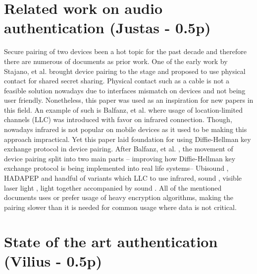\documentclass[12pt]{article}
\begin{document}
\newpage

\section{Related work on audio authentication (Justas - 0.5p)}
\label{sec:Related work on audio authentication}
Secure pairing of two devices been a hot topic for the past decade and therefore there are numerous of documents as prior work. One of the early work by  Stajano, et al. \cite {pairingintro} brought device pairing to the stage and proposed to use physical contact for shared secret sharing. Physical contact such as a cable is not a feasible solution nowadays due to interfaces mismatch on devices and not being user friendly. Nonetheless, this paper was used as an inspiration for new papers in this field. An example of such is Balfanz, et al. \cite {talkingto} where usage of location-limited channels (LLC) was introduced with favor on infrared connection. Though, nowadays infrared is not popular on mobile devices as it used to be making this approach impractical. Yet this paper laid foundation for using Diffie-Hellman key exchange protocol in device pairing. After Balfanz, et al. \cite {talkingto} , the movement of device pairing split into two main parts – improving how Diffie-Hellman key exchange protocol is being implemented into real life systems– Ubisound \cite {ubisound}, HADAPEP \cite {hadapep} and handful of variants which LLC to use infrared, sound \cite {talkingto}, visible laser light \cite {laserlight}, light together accompanied by sound \cite {beeplight}.
\newline
All of the mentioned documents uses or prefer usage of heavy encryption algorithms, making the pairing slower than it is needed for common usage where data is not critical.

\section{State of the art authentication (Vilius - 0.5p)}
\label{sec:State of the art authentication}
\end{document}
